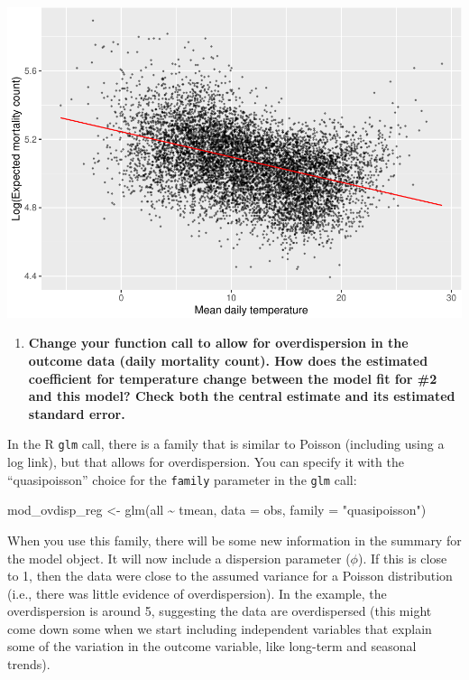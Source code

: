 \documentclass[
]{book}
\newenvironment{Shaded}{\begin{snugshade}}{\end{snugshade}}
\newcommand{\AttributeTok}[1]{\textcolor[rgb]{0.77,0.63,0.00}{#1}}
\newcommand{\FunctionTok}[1]{\textcolor[rgb]{0.00,0.00,0.00}{#1}}
\newcommand{\NormalTok}[1]{#1}
\newcommand{\OtherTok}[1]{\textcolor[rgb]{0.56,0.35,0.01}{#1}}
\newcommand{\SpecialCharTok}[1]{\textcolor[rgb]{0.00,0.00,0.00}{#1}}
\newcommand{\StringTok}[1]{\textcolor[rgb]{0.31,0.60,0.02}{#1}}
\providecommand{\tightlist}{%
  \setlength{\itemsep}{0pt}\setlength{\parskip}{0pt}}
\begin{document}
\includegraphics{adv_epi_analysis_files/figure-latex/unnamed-chunk-32-1.pdf}

\begin{enumerate}
\def\labelenumi{\arabic{enumi}.}
\setcounter{enumi}{2}
\tightlist
\item
  \textbf{Change your function call to allow for overdispersion in the outcome data
  (daily mortality count). How does the estimated coefficient for temperature
  change between the model fit for \#2 and this model? Check both the central
  estimate and its estimated standard error.}
\end{enumerate}

In the R \texttt{glm} call, there is a family that is similar to Poisson (including
using a log link), but that allows for overdispersion. You can specify it
with the ``quasipoisson'' choice for the \texttt{family} parameter in the \texttt{glm} call:

\begin{Shaded}
\begin{Highlighting}[]
\NormalTok{mod\_ovdisp\_reg }\OtherTok{\textless{}{-}} \FunctionTok{glm}\NormalTok{(all }\SpecialCharTok{\textasciitilde{}}\NormalTok{ tmean, }\AttributeTok{data =}\NormalTok{ obs, }\AttributeTok{family =} \StringTok{"quasipoisson"}\NormalTok{)}
\end{Highlighting}
\end{Shaded}

When you use this family, there will be some new information in the summary
for the model object. It will now include a dispersion parameter (\(\phi\)). If this
is close to 1, then the data were close to the assumed variance for a Poisson
distribution (i.e., there was little evidence of overdispersion). In the
example, the overdispersion is around 5, suggesting the data are overdispersed
(this might come down some when we start including independent variables that
explain some of the variation in the outcome variable, like long-term and
seasonal trends).
\end{document}

